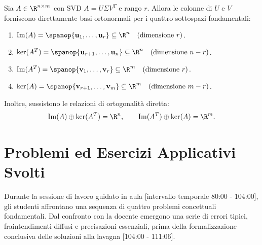 \begin{theorem}
\label{thm:sottospazi-svd-generale}
Sia $A \in \R^{n \times m}$ con SVD $A = U \Sigma V^T$ e rango $r$. Allora le colonne di $U$ e $V$ forniscono direttamente basi ortonormali per i quattro sottospazi fondamentali:
\begin{enumerate}
    \item $\operatorname{Im}(A) = \spanop\{\mathbf{u}_1, \dots, \mathbf{u}_r\} \subseteq \R^n \quad (\text{dimensione } r)$.
    \item $\ker(A^T) = \spanop\{\mathbf{u}_{r+1}, \dots, \mathbf{u}_n\} \subseteq \R^n \quad (\text{dimensione } n - r)$.
    \item $\operatorname{Im}(A^T) = \spanop\{\mathbf{v}_1, \dots, \mathbf{v}_r\} \subseteq \R^m \quad (\text{dimensione } r)$.
    \item $\ker(A) = \spanop\{\mathbf{v}_{r+1}, \dots, \mathbf{v}_m\} \subseteq \R^m \quad (\text{dimensione } m - r)$.
\end{enumerate}
Inoltre, sussistono le relazioni di ortogonalit\`a diretta:
\begin{equation}
    \operatorname{Im}(A) \oplus \ker(A^T) = \R^n, \qquad \operatorname{Im}(A^T) \oplus \ker(A) = \R^m.
\end{equation}
\end{theorem}

\FloatBarrier
\section{Problemi ed Esercizi Applicativi Svolti}
\label{sec:svd-problemi-esercizi}

Durante la sessione di lavoro guidato in aula [intervallo temporale 80:00 - 104:00], gli studenti affrontano una sequenza di quattro problemi concettuali fondamentali. Dal confronto con la docente emergono una serie di errori tipici, fraintendimenti diffusi e precisazioni essenziali, prima della formalizzazione conclusiva delle soluzioni alla lavagna [104:00 - 111:06].

